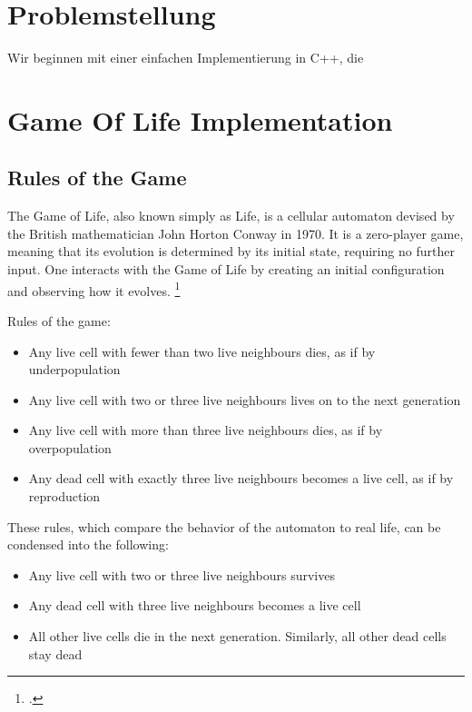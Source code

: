 \documentclass[a4paper,english,12pt,twoside=false]{scrartcl} %
\begin{document}
\pagebreak

\section{Problemstellung}

Wir beginnen mit einer einfachen Implementierung in C++, die 

\section{Game Of Life Implementation}

\subsection{Rules of the Game}

The Game of Life, also known simply as Life, is a cellular automaton devised by the British mathematician John Horton Conway in 1970. It is a zero-player game, meaning that its evolution is determined by its initial state, requiring no further input. One interacts with the Game of Life by creating an initial configuration and observing how it evolves. \footcite{placeholder}

\breakln

Rules of the game:

\begin{itemize}
	\item{Any live cell with fewer than two live neighbours dies, as if by underpopulation}
	\item{Any live cell with two or three live neighbours lives on to the next generation}
	\item{Any live cell with more than three live neighbours dies, as if by overpopulation}
	\item{Any dead cell with exactly three live neighbours becomes a live cell, as if by reproduction}
\end{itemize}

These rules, which compare the behavior of the automaton to real life, can be condensed into the following:

\begin{itemize}
	\item{Any live cell with two or three live neighbours survives}
	\item{Any dead cell with three live neighbours becomes a live cell}
	\item{All other live cells die in the next generation. Similarly, all other dead cells stay dead}
\end{itemize}
\end{document}
